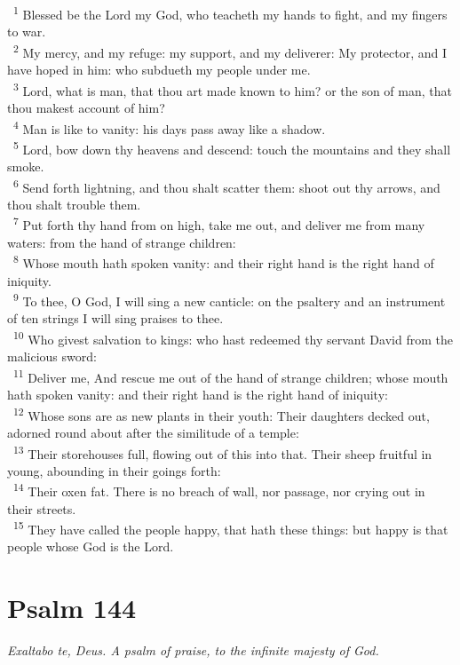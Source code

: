 \documentclass[a5paper,12pt]{article}
\begin{document}
\begin{multicols*}{2}
~\textsuperscript{1} Blessed be the Lord my God, who teacheth my hands to fight, and my fingers to war.\\
~\textsuperscript{2} My mercy, and my refuge: my support, and my deliverer: My protector, and I have hoped in him: who subdueth my people under me.\\
~\textsuperscript{3} Lord, what is man, that thou art made known to him? or the son of man, that thou makest account of him?\\
~\textsuperscript{4} Man is like to vanity: his days pass away like a shadow.\\
~\textsuperscript{5} Lord, bow down thy heavens and descend: touch the mountains and they shall smoke.\\
~\textsuperscript{6} Send forth lightning, and thou shalt scatter them: shoot out thy arrows, and thou shalt trouble them.\\
~\textsuperscript{7} Put forth thy hand from on high, take me out, and deliver me from many waters: from the hand of strange children:\\
~\textsuperscript{8} Whose mouth hath spoken vanity: and their right hand is the right hand of iniquity.\\
~\textsuperscript{9} To thee, O God, I will sing a new canticle: on the psaltery and an instrument of ten strings I will sing praises to thee.\\
~\textsuperscript{10} Who givest salvation to kings: who hast redeemed thy servant David from the malicious sword:\\
~\textsuperscript{11} Deliver me, And rescue me out of the hand of strange children; whose mouth hath spoken vanity: and their right hand is the right hand of iniquity:\\
~\textsuperscript{12} Whose sons are as new plants in their youth: Their daughters decked out, adorned round about after the similitude of a temple:\\
~\textsuperscript{13} Their storehouses full, flowing out of this into that. Their sheep fruitful in young, abounding in their goings forth:\\
~\textsuperscript{14} Their oxen fat. There is no breach of wall, nor passage, nor crying out in their streets.\\
~\textsuperscript{15} They have called the people happy, that hath these things: but happy is that people whose God is the Lord.\\

\section{Psalm 144}
\label{sec:org00b1511}
\emph{Exaltabo te, Deus. A psalm of praise, to the infinite majesty of God.}\\


\end{multicols*}
\end{document}

